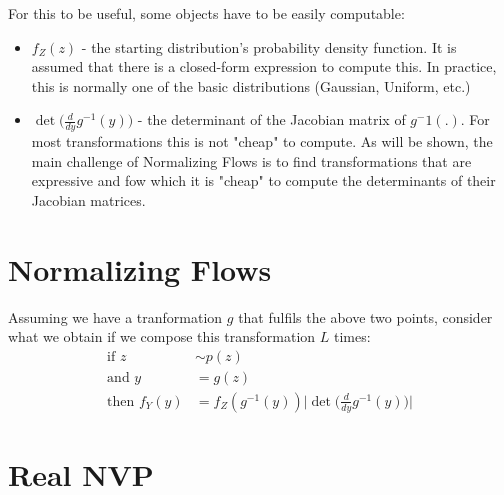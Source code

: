 For this to be useful, some objects have to be easily computable:
\begin{itemize}
    \item $f_Z(z)$ - the starting distribution's probability density function.
        It is assumed that there is a closed-form expression to compute this. In
        practice, this is normally one of the basic distributions (Gaussian,
        Uniform, etc.)
    \item $\det\Big(\frac{d}{dy}g^{-1}(y)\Big)$ - the determinant  of the Jacobian
        matrix of $g^-1(.)$. For most transformations this is not "cheap" to compute.
        As will be shown, the main challenge of Normalizing Flows is to find
        transformations that are expressive and fow which it is "cheap" to compute
        the determinants of their Jacobian matrices.
\end{itemize}

\section{Normalizing Flows}
Assuming we have a tranformation $g$ that fulfils the above two points, consider
what we obtain if we compose this transformation $L$ times:
\begin{align}
    \mbox{if } z &\sim p(z) \\
    \mbox{and } y &= g(z) \\
    \mbox{then } f_Y(y) &= f_Z(g^{-1}(y))\Big|\det\Big(\frac{d}{dy}g^{-1}(y)\Big)\Big|
\end{align}




\section{Real NVP}



